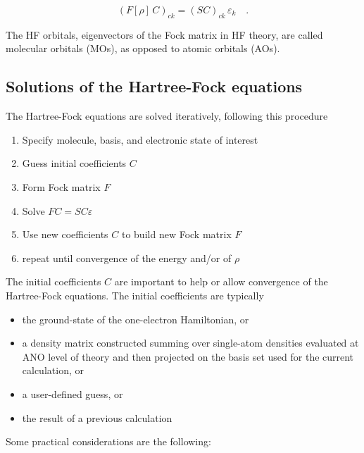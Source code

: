 \documentclass{article}
\begin{document}
\begin{equation}
\left( F[\rho] \, C \right)_{ck} = \left( S C \right)_{ck} \, \varepsilon_k \quad .
\end{equation}

The HF orbitals, eigenvectors of the Fock matrix in HF theory, are called molecular orbitals (MOs),
as opposed to atomic orbitals (AOs).

\pagebreak
\newpage

\subsection{Solutions of the Hartree-Fock equations}

The Hartree-Fock equations are solved iteratively, following this procedure
\begin{enumerate}
\item Specify molecule, basis, and electronic state of interest
\item Guess initial coefficients $C$
\item Form Fock matrix $F$
\item Solve $FC=SC\varepsilon$
\item Use new coefficients $C$ to build new Fock matrix $F$
\item repeat until convergence of the energy and/or of $\rho$
\end{enumerate}
The initial coefficients $C$ are important to help or allow convergence of the Hartree-Fock equations. The initial coefficients are typically
\begin{itemize}
\item the ground-state of the one-electron Hamiltonian, or
\item a density matrix constructed summing over single-atom densities evaluated at ANO level of theory and then projected on the basis set used for the current calculation, or 
\item a user-defined guess, or
\item the result of a previous calculation
\end{itemize}
Some practical considerations are the following:
\end{document}
